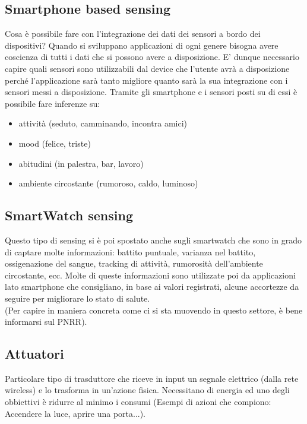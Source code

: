 \subsection{Smartphone based sensing}
Cosa è possibile fare con l'integrazione dei dati dei sensori a bordo dei dispositivi?
Quando si sviluppano applicazioni di ogni genere bisogna avere coscienza di tutti i dati che si possono avere a disposizione. E' dunque necessario capire quali sensori sono utilizzabili dal device che l'utente avrà a disposizione perché l'applicazione sarà tanto migliore quanto sarà la sua integrazione con i sensori messi a disposizione.
\newpage
Tramite gli smartphone e i sensori posti su di essi è possibile fare inferenze su:
\begin{itemize}
    \item attività (seduto, camminando, incontra amici)
    \item mood (felice, triste)
    \item abitudini (in palestra, bar, lavoro)
    \item ambiente circostante (rumoroso, caldo, luminoso)
\end{itemize}

\subsection{SmartWatch sensing}
Questo tipo di sensing si è poi spostato anche sugli smartwatch che sono in grado di captare molte informazioni: battito puntuale, varianza nel battito, ossigenazione del sangue, tracking di attività, rumorosità dell'ambiente circostante, ecc. Molte di queste informazioni sono utilizzate poi da applicazioni lato smartphone che consigliano, in base ai valori registrati, alcune accortezze da seguire per migliorare lo stato di salute.\\
(Per capire in maniera concreta come ci si sta muovendo in questo settore, è bene informarsi sul PNRR).

\subsection{Attuatori}
Particolare tipo di trasduttore che riceve in input un segnale elettrico (dalla rete wireless) e lo trasforma in un'azione fisica. Necessitano di energia ed uno degli obbiettivi è ridurre al minimo i consumi (Esempi di azioni che compiono: Accendere la luce, aprire una porta...).


